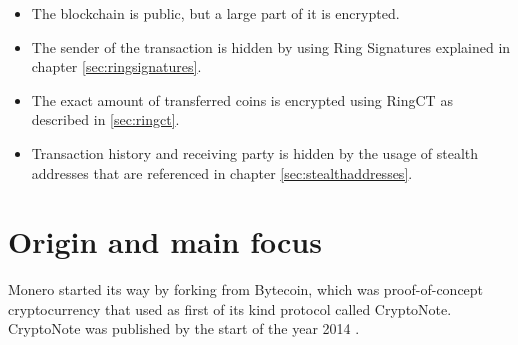 \documentclass[
  printed, %
  table,   %
  nolof,     %
  nolot,     %
           oneside, color
]{fithesis3}
\begin{document}

\begin{itemize}\itemsep0em
\item The blockchain is public, but a large part of it is encrypted.
\item The sender of the transaction is hidden by using Ring Signatures explained in chapter  \ref{sec:ringsignatures}.
\item The exact amount of transferred coins is encrypted using RingCT as described in \ref{sec:ringct}.
\item Transaction history and receiving party is hidden by the usage of stealth addresses that are referenced in chapter \ref{sec:stealthaddresses}.
\end{itemize}

\section{Origin and main focus}
Monero started its way by forking from Bytecoin, which was proof-of-concept cryptocurrency that used as first of its kind protocol called CryptoNote. CryptoNote was published by the start of the year 2014 \cite{githubbytecoin}.


\end{document}
